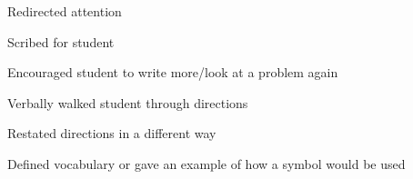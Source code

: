 \documentclass[12pt]{exam}
\begin{document}
\begin{coverpages}
{\vspace{-2mm}
\begin{checklist}[itemsep=3pt, parsep=-3pt]
\item Redirected attention
\item Scribed for student
\item Encouraged student to write more/look at a problem again
\item Verbally walked student through directions
\item Restated directions in a different way
\item Defined vocabulary or gave an example of how a symbol would be used
\end{checklist}
}

% 
% 
% 
% 


\end{coverpages}

\end{document}
